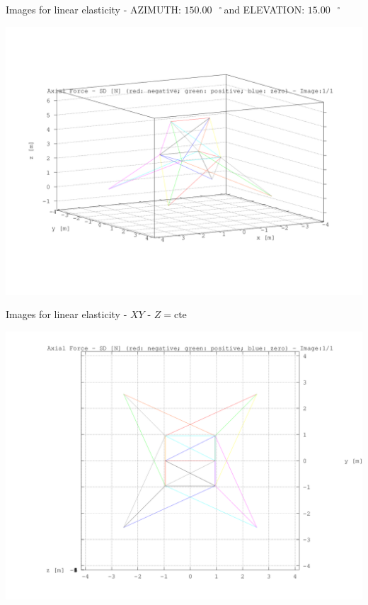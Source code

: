 \documentclass[a4paper,11pt]{article}
\newcommand{\grad}{\hspace{-2.5mm}$\,\phantom{a}^{\circ}\,$}
\begin{document}
\newpage       
\begin{center}       
Images for linear elasticity - AZIMUTH: $150.00$\grad and ELEVATION: $ 15.00$\grad

\includegraphics[width=.80\textwidth]{../../axial_force/torre_axial_force_1.png}      

\end{center}       
\newpage       
\begin{center}       
Images for linear elasticity -  $XY$ - $Z=\text{cte}$ 

\includegraphics[width=.80\textwidth]{../../XY_XZ_YZ/XY/axial_force/torre_axial_force_XY_1.png}      

\end{center}       
\newpage       
\end{document}
